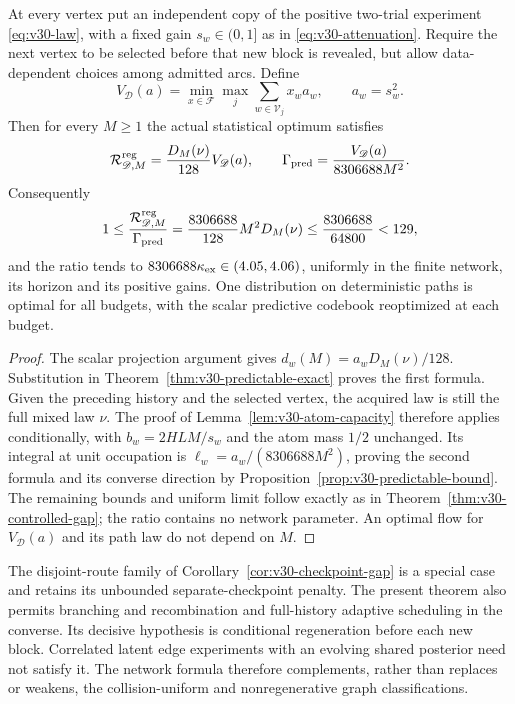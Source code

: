 \begin{corollary}
\label{cor:v30-network-gap}
At every vertex put an independent copy of the positive two-trial
experiment \eqref{eq:v30-law}, with a fixed gain $s_w\in(0,1]$ as in
\eqref{eq:v30-attenuation}. Require the next vertex to be selected
before that new block is revealed, but allow data-dependent choices
among admitted arcs. Define
\[
 V_{\mathscr D}(a)=\min_{x\in\mathcal F}\max_j
                       \sum_{w\in\mathscr V_j}x_w a_w,
                      \qquad a_w=s_w^2.
\]
Then for every $M\ge1$ the actual statistical optimum satisfies
\begin{equation}\label{eq:v30-network-gap}
 \mathcal R_{\mathscr D,M}^{\rm reg}
      =\frac{D_M(\nu)}{128}V_{\mathscr D}(a),\qquad
 \Gamma_{\rm pred}
      =\frac{V_{\mathscr D}(a)}{8306688M^2}.
\end{equation}
Consequently
\[
 1\le\frac{\mathcal R_{\mathscr D,M}^{\rm reg}}{\Gamma_{\rm pred}}
     =\frac{8306688}{128}M^2D_M(\nu)
     \le\frac{8306688}{64800}<129,
\]
and the ratio tends to $8306688\kappa_{\rm ex}\in(4.05,4.06)$,
uniformly in the finite network, its horizon and its positive gains.
One distribution on deterministic paths is optimal for all budgets,
with the scalar predictive codebook reoptimized at each budget.
\end{corollary}
\begin{proof}
The scalar projection argument gives
$d_w(M)=a_wD_M(\nu)/128$. Substitution in
Theorem~\ref{thm:v30-predictable-exact} proves the first formula.
Given the preceding history and the selected vertex, the acquired
law is still the full mixed law $\nu$. The proof of
Lemma~\ref{lem:v30-atom-capacity} therefore applies conditionally,
with $b_w=2HLM/s_w$ and the atom mass $1/2$ unchanged. Its integral
at unit occupation is $\ell_w=a_w/(8306688M^2)$, proving the
second formula and its converse direction by
Proposition~\ref{prop:v30-predictable-bound}. The remaining bounds
and uniform limit follow exactly as in
Theorem~\ref{thm:v30-controlled-gap}; the ratio contains no network
parameter. An optimal flow for $V_{\mathscr D}(a)$ and its path
law do not depend on $M$.
\end{proof}

The disjoint-route family of
Corollary~\ref{cor:v30-checkpoint-gap} is a special case and retains
its unbounded separate-checkpoint penalty. The present theorem also
permits branching and recombination and full-history adaptive
scheduling in the converse. Its decisive hypothesis is conditional
regeneration before each new block. Correlated latent edge experiments
with an evolving shared posterior need not satisfy it. The network
formula therefore complements, rather than replaces or weakens, the
collision-uniform and nonregenerative graph classifications.
